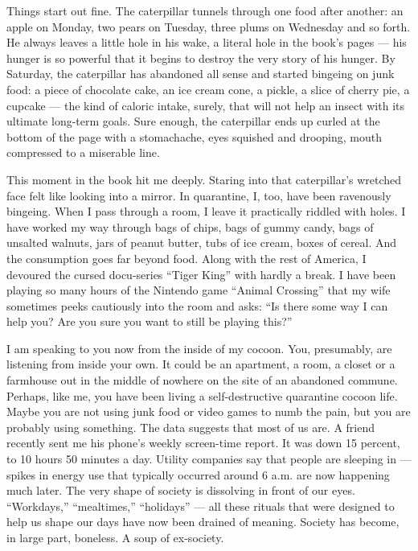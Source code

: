 Things start out fine. The caterpillar tunnels through one food after
another: an apple on Monday, two pears on Tuesday, three plums on
Wednesday and so forth. He always leaves a little hole in his wake, a
literal hole in the book's pages --- his hunger is so powerful that it
begins to destroy the very story of his hunger. By Saturday, the
caterpillar has abandoned all sense and started bingeing on junk food: a
piece of chocolate cake, an ice cream cone, a pickle, a slice of cherry
pie, a cupcake --- the kind of caloric intake, surely, that will not
help an insect with its ultimate long-term goals. Sure enough, the
caterpillar ends up curled at the bottom of the page with a stomachache,
eyes squished and drooping, mouth compressed to a miserable line.

This moment in the book hit me deeply. Staring into that caterpillar's
wretched face felt like looking into a mirror. In quarantine, I, too,
have been ravenously bingeing. When I pass through a room, I leave it
practically riddled with holes. I have worked my way through bags of
chips, bags of gummy candy, bags of unsalted walnuts, jars of peanut
butter, tubs of ice cream, boxes of cereal. And the consumption goes far
beyond food. Along with the rest of America, I devoured the cursed
docu-series ``Tiger King'' with hardly a break. I have been playing so
many hours of the Nintendo game ``Animal Crossing'' that my wife
sometimes peeks cautiously into the room and asks: ``Is there some way I
can help you? Are you sure you want to still be playing this?''

I am speaking to you now from the inside of my cocoon. You, presumably,
are listening from inside your own. It could be an apartment, a room, a
closet or a farmhouse out in the middle of nowhere on the site of an
abandoned commune. Perhaps, like me, you have been living a
self-destructive quarantine cocoon life. Maybe you are not using junk
food or video games to numb the pain, but you are probably using
something. The data suggests that most of us are. A friend recently sent
me his phone's weekly screen-time report. It was down 15 percent, to 10
hours 50 minutes a day. Utility companies say that people are sleeping
in --- spikes in energy use that typically occurred around 6 a.m. are
now happening much later. The very shape of society is dissolving in
front of our eyes. ``Workdays,'' ``mealtimes,'' ``holidays'' --- all
these rituals that were designed to help us shape our days have now been
drained of meaning. Society has become, in large part, boneless. A soup
of ex-society.

